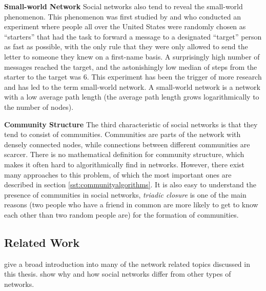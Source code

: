 \textbf{Small-world Network} Social networks also tend to reveal the small-world phenomenon. This phenomenon was first studied by \cite{Milgram_1967} and \cite{Travers_1969} who conducted an experiment where people all over the United States were randomly chosen as ``starters'' that had the task to forward a message to a designated ``target'' person as fast as possible, with the only rule that they were only allowed to send the letter to someone they knew on a first-name basis. A surprisingly high number of messages reached the target, and the astonishingly low median of steps from the starter to the target was 6. This experiment has been the trigger of more research and has led to the term small-world network. A small-world network is a network with a low average path length (the average path length grows logarithmically to the number of nodes).
\newline

\textbf{Community Structure} The third characteristic of social networks is that they tend to consist of communities. Communities are parts of the network with densely connected nodes, while connections between different communities are scarcer. There is no mathematical definition for community structure, which makes it often hard to algorithmically find in networks. However, there exist many approaches to this problem, of which the most important ones are described in section \ref{sst:communityalgorithms}. It is also easy to understand the presence of communities in social networks, \textit{triadic closure} \cite{Easley_2010} is one of the main reasons (two people who have a friend in common are more likely to get to know each other than two random people are) for the formation of communities.

\subsection{Related Work}
\label{sst:snrelatedwork} \cite{Easley_2010} give a broad introduction into many of the network related topics discussed in this thesis. \cite{Newman_2003} show why and how social networks differ from other types of networks.

